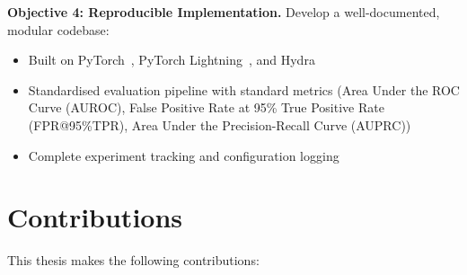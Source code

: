 \textbf{Objective 4: Reproducible Implementation.} Develop a well-documented, modular codebase:

\begin{itemize}
    \item Built on PyTorch~\cite{paszke2019pytorch}, PyTorch Lightning~\cite{falcon2019pytorch}, and Hydra~\cite{yadan2019hydra}
    \item Standardised evaluation pipeline with standard metrics (Area Under the ROC Curve (AUROC), False Positive Rate at 95\% True Positive Rate (FPR@95\%TPR), Area Under the Precision-Recall Curve (AUPRC))
    \item Complete experiment tracking and configuration logging
\end{itemize}

\endgroup
\section{Contributions}
\label{sec:intro:contributions}
\begingroup
\fontsize{11pt}{13.2pt}\selectfont

This thesis makes the following contributions:

